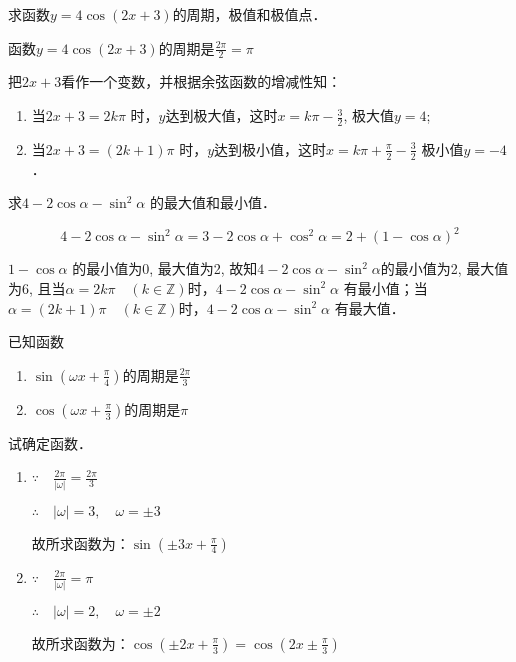 \begin{example}
    求函数$y=4\cos(2x+3)$的周期，极值和极值点．
\end{example}

\begin{solution}
    函数$y=4\cos(2x+3)$的周期是$\frac{2\pi}{2}=\pi$

把$2x+3$看作一个变数，并根据余弦函数的增减性知：
\begin{enumerate}
    \item 当$2x+3=2k\pi$ 时，$y$达到极大值，这时$x=k\pi -\frac{3}{2}$,
    极大值$y=4$;
    \item 当$2x+3=(2k+1)\pi$ 时，$y$达到极小值，这时$x=k\pi +\frac{\pi}{2}-\frac{3}{2}$
    极小值$y=-4$．
\end{enumerate}
\end{solution}


\begin{example}
    求$4-2\cos\alpha -\sin^2\alpha$ 的最大值和最小值．
\end{example}


\begin{solution}
    \[4-2\cos\alpha -\sin^2\alpha=3-2\cos\alpha+\cos^2\alpha = 2+(1-\cos\alpha)^2\]

$1-\cos\alpha$ 的最小值为0, 最大值为2, 故知$4-2\cos\alpha -\sin^2\alpha$的最小值为2, 最大值为6, 且当$\alpha=2k\pi\quad  (k\in\mathbb{Z})$时，$4-2\cos\alpha -\sin^2\alpha$ 有最小值；当$\alpha =(2k+1)\pi\quad  (k\in\mathbb{Z})$时，$4-2\cos\alpha -\sin^2\alpha$ 有最大值．
\end{solution}

\begin{example}
    已知函数
\begin{enumerate}
    \item $\sin\left(\omega x+\frac{\pi}{4}\right)$的周期是$\frac{2\pi}{3}$
    \item $\cos\left(\omega x+\frac{\pi}{3}\right)$的周期是$\pi$
\end{enumerate}    
试确定函数．    
\end{example}

\begin{solution}
\begin{enumerate}
    \item $\because\quad \frac{2\pi}{|\omega|}=\frac{2\pi}{3}$
    
$\therefore\quad |\omega|=3,\quad \omega=\pm 3$

故所求函数为：$\sin\left(\pm 3x+\frac{\pi}{4}\right)$

\item $\because\quad \frac{2\pi}{|\omega|}=\pi$
    
$\therefore\quad |\omega|=2,\quad \omega=\pm 2$

故所求函数为：$\cos\left(\pm 2x+\frac{\pi}{3}\right)=\cos\left(2x\pm \frac{\pi}{3}\right)$
\end{enumerate}  
\end{solution}


